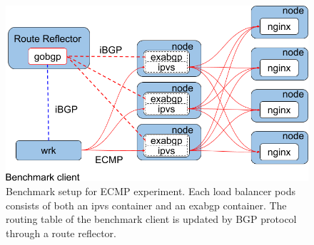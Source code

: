 \begin{figure}[h]
  \centering
  \includegraphics[width=0.9\columnwidth]{Figs/lb_ecmp_schem}

  \par\bigskip
  \centering
  \begin{minipage}{0.9\columnwidth}
    \caption[Benchmark setup for ECMP experiment]{
      Benchmark setup for ECMP experiment.
      Each load balancer pods consists of both an ipvs container and an exabgp container.
      The routing table of the benchmark client is updated by BGP protocol through a route reflector.
    }
    \label{fig:ecmp-benchmark-schem}
  \end{minipage}
\end{figure}

